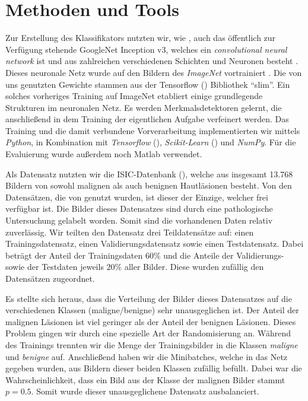 \section{Methoden und Tools}

Zur Erstellung des Klassifikators nutzten wir, wie \citet{esteva2017dermatologist}, auch das öffentlich zur Verfügung stehende GoogleNet Inception v3, welches ein \textit{convolutional neural network} ist und aus zahlreichen verschiedenen Schichten und Neuronen besteht \citep{szegedy2016rethinking}. Dieses neuronale Netz wurde auf den Bildern des \textit{ImageNet} vortrainiert \citep{russakovsky2015imagenet}. Die von uns genutzten Gewichte stammen aus der Tensorflow (\cite{tensorflow2015-whitepaper}) Bibliothek ``slim''.
Ein solches vorheriges Training auf ImageNet etabliert einige grundlegende Strukturen im neuronalen Netz. Es werden Merkmalsdetektoren gelernt, die anschließend in dem Training der eigentlichen Aufgabe verfeinert werden.  Das Training und die damit verbundene Vorverarbeitung implementierten wir mittels \textit{Python}, in Kombination mit \textit{Tensorflow} (\cite{tensorflow2015-whitepaper}), \textit{Scikit-Learn} (\cite{scikit-learn}) und \textit{NumPy}. Für die Evaluierung wurde außerdem noch Matlab verwendet.

Als Datensatz nutzten wir die ISIC-Datenbank (\cite{ISIC}), welche aus insgesamt 13.768 Bildern von sowohl malignen als auch benignen Hautläsionen besteht. Von den Datensätzen, die von \citet{esteva2017dermatologist} genutzt wurden, ist dieser der Einzige, welcher frei verfügbar ist. Die Bilder dieses Datensatzes sind durch eine pathologische Untersuchung gelabelt worden. Somit sind die vorhandenen Daten relativ zuverlässig. Wir teilten den Datensatz drei Teildatensätze auf: einen Trainingsdatensatz, einen Validierungsdatensatz sowie einen Testdatensatz. Dabei beträgt der Anteil der Trainingsdaten $60\%$ und die Anteile der Validierungs- sowie der Testdaten jeweils $20\%$ aller Bilder. Diese wurden zufällig den Datensätzen zugeordnet.

Es stellte sich heraus, dass die Verteilung der Bilder dieses Datensatzes auf die verschiedenen Klassen (maligne/benigne) sehr unausgeglichen ist. Der Anteil der malignen Läsionen ist viel geringer als der Anteil der benignen Läsionen. Dieses Problem gingen wir durch eine spezielle Art der Randomisierung an. Während des Trainings trennten wir die Menge der Trainingsbilder in die Klassen \textit{maligne} und \textit{benigne} auf. Anschließend haben wir die Minibatches, welche in das Netz gegeben wurden, aus Bildern dieser beiden Klassen zufällig befüllt. Dabei war die Wahrscheinlichkeit, dass ein Bild aus der Klasse der malignen Bilder stammt $p=0.5$. Somit wurde dieser unausgeglichene Datensatz ausbalanciert.

